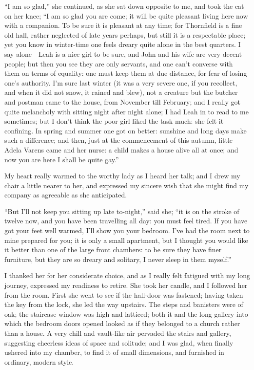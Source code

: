 \enquote{I am so glad,} she continued, as she sat down opposite to me,
and took the cat on her knee; \enquote{I am so glad you are come; it
	will be quite pleasant living here now with a companion. To be sure it
	is pleasant at any time; for Thornfield is a fine old hall, rather
	neglected of late years perhaps, but still it is a respectable place;
	yet you know in winter-time one feels dreary quite alone in the best
	quarters. I say alone---Leah is a nice girl to be sure, and John and
	his wife are very decent people; but then you see they are only
	servants, and one can't converse with them on terms of equality: one
	must keep them at due distance, for fear of losing one's authority. I'm
	sure last winter (it was a very severe one, if you recollect, and when
	it did not snow, it rained and blew), not a creature but the butcher and
	postman came to the house, from November till February; and I really got
	quite melancholy with sitting night after night alone; I had Leah in to
	read to me sometimes; but I don't think the poor girl liked the task
	much: she felt it confining. In spring and summer one got on better:
	sunshine and long days make such a difference; and then, just at the
	commencement of this autumn, little Adela Varens came and her nurse: a
	child makes a house alive all at once; and now you are here I shall be
	quite gay.}

My heart really warmed to the worthy lady as I heard her talk; and I
drew my chair a little nearer to her, and expressed my sincere wish that
she might find my company as agreeable as she anticipated.

\enquote{But I'll not keep you sitting up late to-night,} said she;
\enquote{it is on the stroke of twelve now, and you have been travelling
	all day: you must feel tired. If you have got your feet well warmed,
	I'll show you your bedroom. I've had the room next to mine prepared for
	you; it is only a small apartment, but I thought you would like it
	better than one of the large front chambers: to be sure they have finer
	furniture, but they are so dreary and solitary, I never sleep in them
	myself.}

I thanked her for her considerate choice, and as I really felt fatigued
with my long journey, expressed my readiness to retire. She took her
candle, and I followed her from the room. First she went to see if the
hall-door was fastened; having taken the key from the lock, she led the
way upstairs. The steps and banisters were of oak; the staircase window
was high and latticed; both it and the long gallery into which the
bedroom doors opened looked as if they belonged to a church rather than
a house. A very chill and vault-like air pervaded the stairs and
gallery, suggesting cheerless ideas of space and solitude; and I was
glad, when finally ushered into my chamber, to find it of small
dimensions, and furnished in ordinary, modern style.

